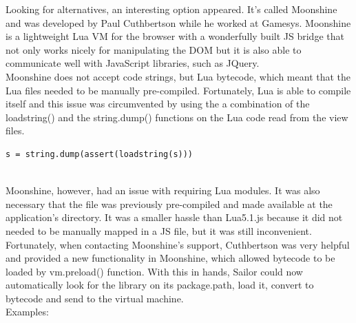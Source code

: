 \documentclass{article}
\begin{document}
Looking for alternatives, an interesting option appeared. It's called Moonshine\autocite{moonshine} and was developed by Paul Cuthbertson while he worked at Gamesys. Moonshine is a lightweight Lua VM for the browser with a wonderfully built JS bridge that not only works nicely for manipulating the DOM but it is also able to communicate well with JavaScript libraries, such as JQuery. \\

Moonshine does not accept code strings, but Lua bytecode, which meant that the Lua files needed to be manually pre-compiled. Fortunately, Lua is able to compile itself and this issue was circumvented by using the a combination of the loadstring() and the string.dump() functions on the Lua code read from the view files.\\

\begin{lstlisting}[frame=single]
s = string.dump(assert(loadstring(s)))
\end{lstlisting}\\

Moonshine, however, had an issue with requiring Lua modules. It was also necessary that the file was previously pre-compiled and made available at the application's directory. It was a smaller hassle than Lua5.1.js because it did not needed to be manually mapped in a JS file, but it was still inconvenient. Fortunately, when contacting Moonshine's support, Cuthbertson was very helpful and provided a new functionality in Moonshine, which allowed bytecode to be loaded by vm.preload() function. With this in hands, Sailor could now automatically look for the library on its package.path, load it, convert to bytecode and send to the virtual machine.\\

Examples:\\
\end{document}
